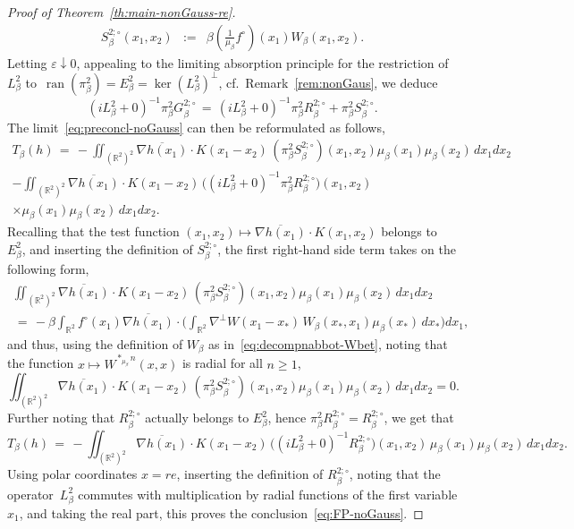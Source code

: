 \documentclass[a4paper,11pt,reqno,noindent]{amsart}
\theoremstyle{plain}
\numberwithin{equation}{section}
\newcommand{\e}{\varepsilon}
\newcommand{\R}{\mathbb R}
\newcommand{\3}{|\!|\!|}
\begin{document}
\begin{proof}[Proof of Theorem~\ref{th:main-nonGauss-re}]
\begin{eqnarray*}
S_\beta^{2;\circ}(x_1,x_2)&:=&\beta(\tfrac1{\mu_\beta}f^\circ)(x_1)W_\beta(x_1,x_2).
\end{eqnarray*}
Letting $\e\downarrow0$, appealing to the limiting absorption principle for the restriction of $L_\beta^2$ to~$\operatorname{ran}(\pi_\beta^2)=E_\beta^2=\ker(L_\beta^2)^\bot$, cf.~Remark~\ref{rem:nonGaus}, we deduce
\begin{equation*}
(iL_\beta^2+0)^{-1}\pi_\beta^2G_{\beta}^{2;\circ}
\,=\,(iL_\beta^2+0)^{-1}\pi_\beta^2R_\beta^{2;\circ}+\pi_\beta^2 S_\beta^{2;\circ}.
\end{equation*}
The limit~\eqref{eq:preconcl-noGauss} can then be reformulated as follows,
\begin{multline*}
T_\beta(h)\,=\,-\iint_{(\R^2)^2}\overline{\nabla h(x_1)}\cdot K(x_1-x_2)\,(\pi_\beta^2S_{\beta}^{2;\circ})(x_1,x_2)
\mu_\beta(x_1)\mu_\beta(x_2)\, dx_1dx_2\\
-\iint_{(\R^2)^2}\overline{\nabla h(x_1)}\cdot K(x_1-x_2)\,\big((iL^2_\beta+0)^{-1}\pi_\beta^2R_{\beta}^{2;\circ}\big)(x_1,x_2)\\
\times\mu_\beta(x_1)\mu_\beta(x_2)\, dx_1dx_2.
\end{multline*}
Recalling that the test function $(x_1,x_2)\mapsto\overline{\nabla h(x_1)}\cdot K(x_1,x_2)$ belongs to~$E_\beta^2$, and inserting the definition of $S_\beta^{2;\circ}$, the first right-hand side term takes on the following form,
\begin{multline*}
\iint_{(\R^2)^2}\overline{\nabla h(x_1)}\cdot K(x_1-x_2)\,(\pi_\beta^2S_{\beta}^{2;\circ})(x_1,x_2)
\mu_\beta(x_1)\mu_\beta(x_2)\, dx_1dx_2\\
\,=\,-\beta\int_{\R^2}f^\circ(x_1)\overline{\nabla h(x_1)}\cdot\Big(\int_{\R^2} \nabla^\bot W(x_1-x_*)\, W_\beta(x_*,x_1)
\mu_\beta(x_*)\,dx_*\Big) dx_1,
\end{multline*}
and thus, using the definition of $W_\beta$ as in~\eqref{eq:decompnabbot-Wbet}, noting that the function $x\mapsto W^{\ast_{\mu_\beta}n}(x,x)$ is radial for all $n\ge1$,
\begin{equation*}
\iint_{(\R^2)^2}\overline{\nabla h(x_1)}\cdot K(x_1-x_2)\,(\pi_\beta^2S_{\beta}^{2;\circ})(x_1,x_2)
\mu_\beta(x_1)\mu_\beta(x_2)\, dx_1dx_2=0.
\end{equation*}
Further noting that $R_\beta^{2;\circ}$ actually belongs to $E_\beta^2$, hence $\pi_\beta^2R_\beta^{2;\circ}=R_\beta^{2;\circ}$, we get that
\begin{equation*}
T_\beta(h)\,=\,-\iint_{(\R^2)^2}\overline{\nabla h(x_1)}\cdot K(x_1-x_2)\,\big((iL^2_\beta+0)^{-1}R_{\beta}^{2;\circ}\big)(x_1,x_2)\,\mu_\beta(x_1)\mu_\beta(x_2)\, dx_1dx_2.
\end{equation*}
Using polar coordinates $x=re$, inserting the definition of $R_\beta^{2;\circ}$, noting that the operator~$L^2_\beta$ commutes with multiplication by radial functions of the first variable $x_1$, and taking the real part, this proves the conclusion~\eqref{eq:FP-noGauss}.


\end{proof}
\end{document}
